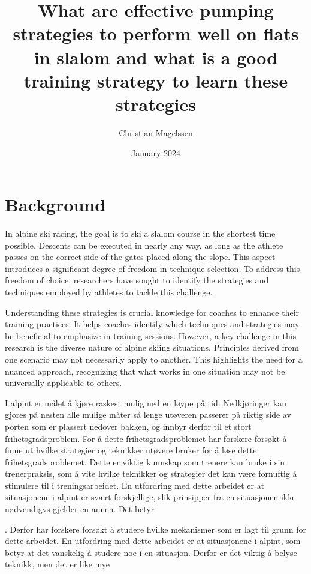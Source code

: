 \documentclass[letterpaper,10pt]{article}
\title{What are effective pumping strategies to perform well on flats in slalom and what is a good training strategy to learn these strategies}
\author{Christian Magelssen}
\date{January 2024}
\begin{document}
\maketitle

\section{Background}

In alpine ski racing, the goal is to ski a slalom course in the shortest time possible. Descents can be executed in nearly any way, as long as the athlete passes on the correct side of the gates placed along the slope. This aspect introduces a significant degree of freedom in technique selection. To address this freedom of choice, researchers have sought to identify the strategies and techniques employed by athletes to tackle this challenge.

Understanding these strategies is crucial knowledge for coaches to enhance their training practices. It helps coaches identify which techniques and strategies may be beneficial to emphasize in training sessions. However, a key challenge in this research is the diverse nature of alpine skiing situations. Principles derived from one scenario may not necessarily apply to another. This highlights the need for a nuanced approach, recognizing that what works in one situation may not be universally applicable to others.



I alpint er målet å kjøre raskest mulig ned en løype på tid. Nedkjøringer kan gjøres på nesten alle mulige måter så lenge utøveren passerer på riktig side av porten som er plassert nedover bakken, og innbyr derfor til et stort frihetsgradsproblem. For å dette frihetsgradsproblemet har forskere forsøkt å finne ut hvilke strategier og teknikker utøvere bruker for å løse dette frihetsgradsproblemet. Dette er viktig kunnskap som trenere kan bruke i sin trenerpraksis, som å vite hvilke teknikker og strategier det kan være fornuftig å stimulere til i treningsarbeidet. En utfordring med dette arbeidet er at situasjonene i alpint er svært forskjellige, slik prinsipper fra en situasjonen ikke nødvendigvs gjelder en annen. Det betyr 


. Derfor har forskere forsøkt å studere hvilke mekanismer som er lagt til grunn for dette arbeidet. En utfordring med dette arbeidet er at situasjonene i alpint, som betyr at det vanskelig å studere noe i en situasjon. Derfor er det viktig å belyse teknikk, men det er like mye 
\end{document}
